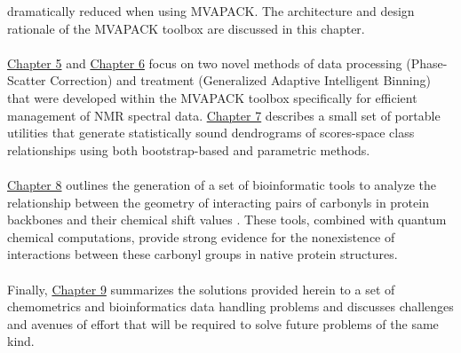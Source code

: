 \begin{doublespace}
dramatically reduced when using MVAPACK. The architecture and design rationale
of the MVAPACK toolbox are discussed in this chapter.
\\\\
\hyperlink{chapter.5}{Chapter 5} and \hyperlink{chapter.6}{Chapter 6} focus on
two novel methods of data processing (Phase-Scatter Correction) and treatment
(Generalized Adaptive Intelligent Binning) that were developed within the
MVAPACK toolbox specifically for efficient management of NMR spectral data.
\hyperlink{chapter.7}{Chapter 7} describes a small set of portable utilities
that generate statistically sound dendrograms of scores-space class
relationships using both bootstrap-based and parametric methods.
\\\\
\hyperlink{chapter.8}{Chapter 8} outlines the generation of a set of
bioinformatic tools to analyze the relationship between the geometry of
interacting pairs of carbonyls in protein backbones and their \cnmr chemical
shift values \cite{worley:pone2012}. These tools, combined with quantum
chemical computations, provide strong evidence for the nonexistence of
\npistar interactions between these carbonyl groups in native protein
structures.
\\\\
Finally, \hyperlink{chapter.9}{Chapter 9} summarizes the solutions provided
herein to a set of chemometrics and bioinformatics data handling problems and
discusses challenges and avenues of effort that will be required to solve
future problems of the same kind.
\end{doublespace}




